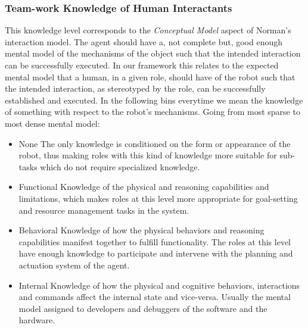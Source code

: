 \documentclass[letterpaper, 10 pt, conference]{ieeeconf} %
\begin{document}
\subsubsection{Team-work Knowledge of Human Interactants}
This knowledge level corresponds to the \textit{Conceptual Model} aspect of Norman's interaction
model. The agent should have a, not complete but, good enough mental model of the mechanisms of the
object such that the intended interaction can be successfully executed. In our framework this
relates to the expected mental model that a human, in a given role, should have of the robot such
that the intended interaction, as stereotyped by the role, can be successfully established and
executed. In the following bins everytime we mean the knowledge of something with respect to the
robot's mechanisms. Going from most sparse to most dense mental model:
\begin{itemize}{}
  \item None \- The only knowledge is conditioned on the form or appearance of the robot, thus
    making roles with this kind of knowledge more suitable for sub-tasks which do not require
    specialized knowledge.
  \item Functional \- Knowledge of the physical and reasoning capabilities and limitations, which
    makes roles at this level more appropriate for goal-setting and resource management tasks in the
    system.
  \item Behavioral \- Knowledge of how the physical behaviors and reasoning capabilities manifest
    together to fulfill functionality. The roles at this level have enough knowledge to participate
    and intervene with the planning and actuation system of the agent.
  \item Internal \- Knowledge of how the physical and cognitive behaviors, interactions and commands
    affect the internal state and vice-versa. Usually the mental model assigned to developers and
    debuggers of the software and the hardware.
\end{itemize}
\end{document}
